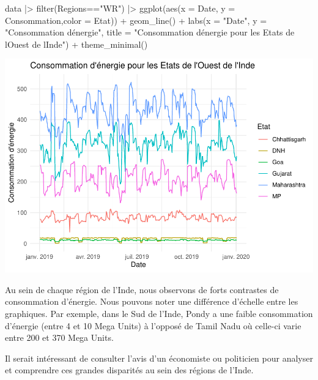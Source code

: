 \documentclass[
]{article}
\newenvironment{Shaded}{\begin{snugshade}}{\end{snugshade}}
\newcommand{\AttributeTok}[1]{\textcolor[rgb]{0.77,0.63,0.00}{#1}}
\newcommand{\FunctionTok}[1]{\textcolor[rgb]{0.00,0.00,0.00}{#1}}
\newcommand{\NormalTok}[1]{#1}
\newcommand{\SpecialCharTok}[1]{\textcolor[rgb]{0.00,0.00,0.00}{#1}}
\newcommand{\StringTok}[1]{\textcolor[rgb]{0.31,0.60,0.02}{#1}}
\begin{document}
\begin{Shaded}
\begin{Highlighting}[]
\NormalTok{data }\SpecialCharTok{|\textgreater{}} 
  \FunctionTok{filter}\NormalTok{(Regions}\SpecialCharTok{==}\StringTok{"WR"}\NormalTok{) }\SpecialCharTok{|\textgreater{}} 
  \FunctionTok{ggplot}\NormalTok{(}\FunctionTok{aes}\NormalTok{(}\AttributeTok{x =}\NormalTok{ Date, }\AttributeTok{y =}\NormalTok{ Consommation,}\AttributeTok{color =}\NormalTok{ Etat)) }\SpecialCharTok{+}
  \FunctionTok{geom\_line}\NormalTok{() }\SpecialCharTok{+}
  \FunctionTok{labs}\NormalTok{(}\AttributeTok{x =} \StringTok{"Date"}\NormalTok{, }\AttributeTok{y =} \StringTok{"Consommation d\textquotesingle{}énergie"}\NormalTok{, }
       \AttributeTok{title =} \StringTok{"Consommation d\textquotesingle{}énergie pour les Etats de l\textquotesingle{}Ouest de l\textquotesingle{}Inde"}\NormalTok{) }\SpecialCharTok{+}
  \FunctionTok{theme\_minimal}\NormalTok{()}
\end{Highlighting}
\end{Shaded}

\includegraphics{Projet_CHESNAIS_GUIBERT_files/figure-latex/unnamed-chunk-17-5.pdf}

Au sein de chaque région de l'Inde, nous observons de forts contrastes
de consommation d'énergie. Nous pouvons noter une différence d'échelle
entre les graphiques. Par exemple, dans le Sud de l'Inde, Pondy a une
faible consommation d'énergie (entre 4 et 10 Mega Units) à l'opposé de
Tamil Nadu où celle-ci varie entre 200 et 370 Mega Units.

Il serait intéressant de consulter l'avis d'un économiste ou politicien
pour analyser et comprendre ces grandes disparités au sein des régions
de l'Inde.
\end{document}
